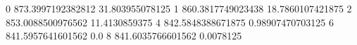 0 873.3997192382812 31.803955078125
1 860.3817749023438 18.7860107421875
2 853.0088500976562 11.4130859375
4 842.5848388671875 0.98907470703125
6 841.5957641601562 0.0
8 841.6035766601562 0.0078125
